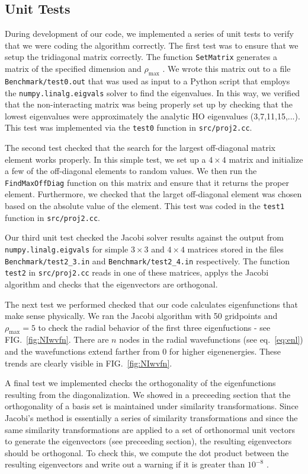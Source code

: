 \documentclass[10pt,showpacs,preprintnumbers,footinbib,amsmath,amssymb,aps,prl,twocolumn,groupedaddress,superscriptaddress,showkeys]{revtex4-1}
\newcommand{\pwrten}[1]{%
	\ensuremath{10^{#1}} }
\newcommand{\rhomax}{
	\ensuremath{ \rho _{\mathrm{max}}} }
\begin{document}
{ 
\subsection{Unit Tests}
During development of our code, we implemented a series of unit tests to verify that
we were coding the algorithm correctly. The first test was to ensure that we setup
the tridiagonal matrix correctly. The function \texttt{SetMatrix} generates a matrix
of the specified dimension and \rhomax. We wrote this matrix out to a file
\texttt{Benchmark/test0.out} that was used as input to a Python script that employs
the \texttt{numpy.linalg.eigvals} solver to find the eigenvalues. In this way, we verified
that the non-interacting matrix was being properly set up by checking that the lowest
eigenvalues were approximately the analytic HO eigenvalues (3,7,11,15,...). This test
was implemented via the \texttt{test0} function in \texttt{src/proj2.cc}.

The second test checked that the search for the largest off-diagonal matrix element
works properly. In this simple test, we set up a $4 \times 4$ matrix and initialize a
few of the off-diagonal elements to random values. We then run the \texttt{FindMaxOffDiag}
function on this matrix and ensure that it returns the proper element. Furthermore, we
checked that the larget off-diagonal element was chosen based on the absolute value
of the element. This test was coded in the \texttt{test1} function in \texttt{src/proj2.cc}.

Our third unit test checked the Jacobi solver results against the output from 
\texttt{numpy.linalg.eigvals} for simple $3 \times 3$ and $4 \times 4$ matrices stored in the
files \texttt{Benchmark/test2\_3.in} and \texttt{Benchmark/test2\_4.in} respectively. The
function \texttt{test2} in \texttt{src/proj2.cc} reads in one of these matrices, applys the
Jacobi algorithm and checks that the eigenvectors are orthogonal.

The next test we performed checked that our code calculates eigenfunctions that make
sense physically. We ran the Jacobi algorithm with 50 gridpoints and $\rhomax=5$ to
check the radial behavior of the first three eigenfuctions - see FIG.~\ref{fig:NIwvfn}.
There are $n$ nodes in the radial wavefunctions (see eq.~\ref{eq:enl}) and the
wavefunctions extend farther from 0 for higher eigenenergies. These trends are clearly
visible in FIG.~\ref{fig:NIwvfn}. 

A final test we implemented checks the orthogonality of the eigenfunctions resulting from
the diagonalization. We showed in a preceeding section that the orthogonality of a basis set
is maintained under similarity transformations. Since Jacobi's method is essentially a series of
similarity transformations and since the same similarity transformations are applied to a set
of orthonormal unit vectors to generate the eigenvectors (see preceeding section), the resulting
eigenvectors should be orthogonal. To check this, we compute the dot product between the
resulting eigenvectors and write out a warning if it is greater than \pwrten{-8}.

}
\end{document}
